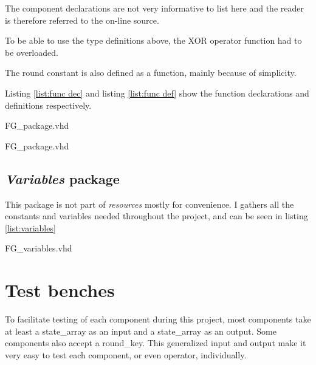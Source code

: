 \documentclass[report.tex]{subfiles}
\begin{document}
The component declarations are not very informative to list here and the reader is therefore referred to the on-line source.

To be able to use the type definitions above, the XOR operator function had to be overloaded.

The round constant is also defined as a function, mainly because of simplicity.

Listing \ref{list:func dec} and listing \ref{list:func def} show the function declarations and definitions respectively.


{FG_package.vhd}


{FG_package.vhd}

\subsection{\emph{Variables} package}
This package is not part of \emph{resources} mostly for convenience. I gathers all the constants and variables needed throughout the project, and can be seen in listing \ref{list:variables}


{FG_variables.vhd}

\section{Test benches}

To facilitate testing of each component during this project, most components take at least a state\_array as an input and a state\_array as an output. Some components also accept a round\_key. This generalized input and output make it very easy to test each component, or even operator, individually.
\end{document}
